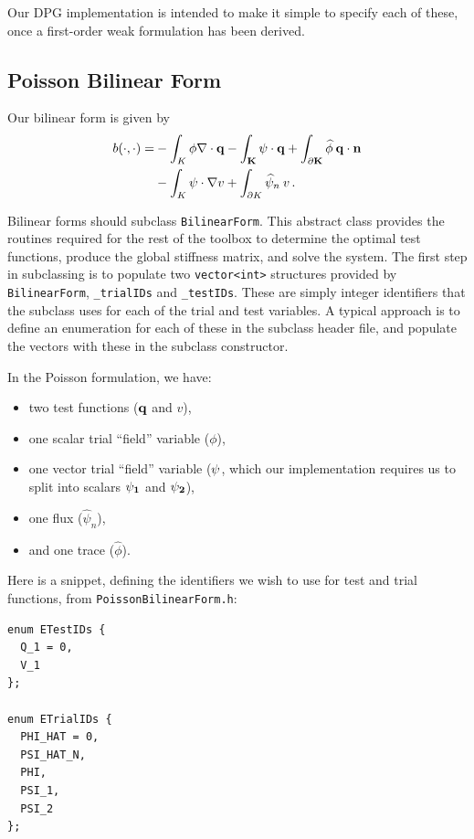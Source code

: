 Our DPG implementation is intended to make it simple to specify each of these, once a first-order weak formulation has been derived.

\subsection{Poisson Bilinear Form}\label{NVR:sec:poissonBilinearForm}
Our bilinear form is given by
\begin{align*}
b(\cdot,\cdot) = &- \int_K \phi \nabla \cdot \bf{q} - \int_K \psi \cdot \bf{q} + \int_{\partial K} \widehat{\phi} \: \bf{q} \cdot \bf{n}\\
&- \int_K \psi \cdot \nabla v + \int_{\partial K} \widehat{\psi}_n \: v \,.
\end{align*}

Bilinear forms should subclass \verb=BilinearForm=.  This abstract class provides the routines required for the rest of the toolbox to determine the optimal test functions, produce the global stiffness matrix, and solve the system.  The first step in subclassing is to populate two \verb=vector<int>= structures provided by \verb=BilinearForm=, \verb=_trialIDs= and \verb=_testIDs=.  These are simply integer identifiers that the subclass uses for each of the trial and test variables.   A typical approach is to define an enumeration for each of these in the subclass header file, and populate the vectors with these in the subclass constructor.

In the Poisson formulation, we have:
\begin{itemize}
\item two test functions ($\bf{q}$ and $v$),
\item one scalar trial ``field'' variable ($\phi$),
\item one vector trial ``field'' variable ($\bf{\psi}$, which our implementation requires us to split into scalars $\bf{\psi}_{1}$ and $\bf{\psi}_{2}$),
\item one flux ($\widehat{\psi}_n$),
\item and one trace ($\widehat{\phi}$).
\end{itemize}

Here is a snippet, defining the identifiers we wish to use for test and trial functions, from \verb=PoissonBilinearForm.h=:
\begin{lstlisting}
enum ETestIDs {
  Q_1 = 0,
  V_1
};

enum ETrialIDs {
  PHI_HAT = 0,
  PSI_HAT_N,
  PHI,
  PSI_1,
  PSI_2
};
\end{lstlisting}

